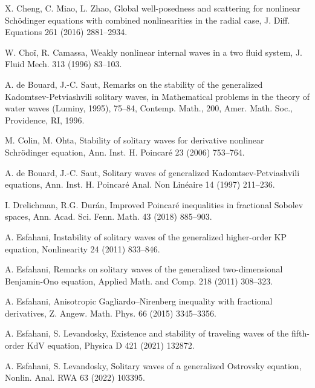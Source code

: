 \documentclass[10pt]{article}
\numberwithin{equation}{section}
\begin{document}
\begin{thebibliography}{00}
			
			X. Cheng, C. Miao, L. Zhao, 
			Global well-posedness and scattering for nonlinear Sch\"{o}dinger equations with combined nonlinearities in the radial case, 
			J. Diff. Equations 261 (2016)  2881--2934.
			
			
			W. Cho\"{i}, R. Camassa, 
			Weakly nonlinear internal waves in a two fluid system, 
			J. Fluid Mech.  313 (1996)  83--103.
			
			
			A. de Bouard, J.-C. Saut,  
			Remarks on the stability of the generalized Kadomtsev-Petviashvili solitary waves, 
			in Mathematical problems in the theory of water waves (Luminy, 1995), 75–84, 
			Contemp. Math., 200, Amer. Math. Soc., Providence, RI, 1996.
			
			
		M.	Colin,   M. Ohta,   Stability of solitary waves for derivative nonlinear
			Schr\"{o}dinger equation,
			 Ann. Inst. H. Poincar\'{e} 23  (2006) 753--764.
			
			
			A. de Bouard, J.-C. Saut, 
			Solitary waves of generalized Kadomtsev-Petviashvili equations, 
			Ann. Inst. H. Poincar\'{e} Anal. Non Lin\'{e}aire 14 (1997)  211--236.
			
			
			
			
			I. Drelichman, R.G. Dur\'{a}n,
			Improved Poincar\'{e} inequalities in fractional Sobolev spaces,
			Ann. Acad. Sci. Fenn. Math. 43 (2018) 885--903.
			
			
			A. Esfahani,  
			Instability of solitary waves of the generalized higher-order KP equation,
			Nonlinearity 24 (2011) 833--846.
	
A. Esfahani, 
Remarks on solitary waves of the generalized two-dimensional Benjamin-Ono
equation, Applied Math. and Comp. 218 (2011) 308--323.			
			
			A. Esfahani,  
			Anisotropic Gagliardo–Nirenberg inequality with fractional derivatives,
			Z. Angew. Math. Phys. 66 (2015) 3345--3356.
			
			
			A. Esfahani, S. Levandosky, Existence and stability of traveling waves of the fifth-order KdV equation, Physica D 421 (2021) 132872.
			
			A. Esfahani, S. Levandosky,
			Solitary waves of a generalized Ostrovsky equation,
			Nonlin. Anal.  RWA 63 (2022) 103395.
			

\end{thebibliography}
\end{document}
